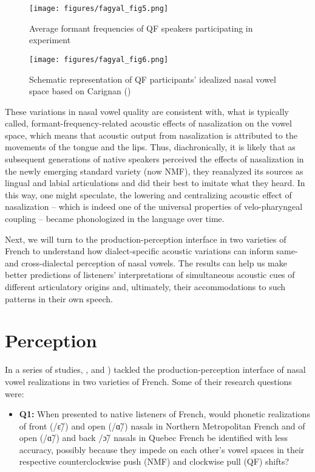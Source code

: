 \documentclass[output=paper,colorlinks,citecolor=brown]{langscibook}
\begin{document}
\begin{figure}

    \texttt{[image: figures/fagyal\_fig5.png]}
    \caption{Average formant frequencies of QF speakers participating in  experiment \citep[][1209]{NicholasCarignan2019} }
    \label{fig:5}
\end{figure}

\begin{figure}

    \texttt{[image: figures/fagyal\_fig6.png]}
    \caption{Schematic representation of QF participants’ idealized nasal vowel space based on Carignan     (\citeyear{Carignan2013})}
    \label{fig:6}
\end{figure}

These variations in nasal vowel quality are consistent with, what is typically called, formant-frequency-related acoustic effects of nasalization on the vowel space, which means that acoustic output from nasalization is attributed to the movements of the tongue and the lips. Thus, diachronically, it is likely that as subsequent generations of native speakers perceived the effects of nasalization in the newly emerging standard variety (now NMF), they reanalyzed its sources as lingual and labial articulations and did their best to imitate what they heard. In this way, one might speculate, the lowering and centralizing acoustic effect of nasalization -- which is indeed one of the universal properties of velo-pharyngeal coupling -- became phonologized in the language over time.

Next, we will turn to the production-perception interface in two varieties of French to understand how dialect-specific acoustic variations can inform same- and cross-dialectal perception of nasal vowels. The results can help us make better predictions of listeners’ interpretations of simultaneous acoustic cues of different articulatory origins and, ultimately, their accommodations to such patterns in their own speech.

\section{Perception}
In a series of studies, \citet{Nicholas2018}, \citet{NicholasCarignan2019} and \citet{nicholas_role_review}) tackled the production-perception interface of nasal vowel realizations in two varieties of French. Some of their research questions were:
\begin{itemize}
    \item \textbf{Q1:} When presented to native listeners of French, would phonetic realizations of front (/ɛ̃/) and open (/ɑ̃/) nasals in Northern Metropolitan French and of open (/ɑ̃/) and back /ɔ̃/ nasals in Quebec French be identified with less accuracy, possibly because they impede on each other’s vowel spaces in their respective counterclockwise push (NMF) and clockwise pull (QF) shifts?
\end{itemize}
\end{document}
